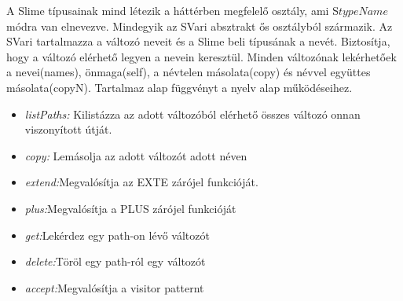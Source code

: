 {A Slime típusainak mind létezik a háttérben megfelelő osztály, ami S{$ typeName $} módra van elnevezve. 
Mindegyik az SVari absztrakt ős osztályból származik.
Az SVari tartalmazza a változó neveit és a Slime beli típusának a nevét.
Biztosítja, hogy a változó elérhető legyen a nevein keresztül.
Minden változónak lekérhetőek a nevei(names), önmaga(self), a névtelen másolata(copy) és névvel együttes másolata(copyN).
Tartalmaz alap függvényt a nyelv alap működéseihez.
\begin{itemize}
\item \emph{listPaths:} Kilistázza az adott változóból elérhető összes változó onnan viszonyított útját.
\item \emph{copy:} Lemásolja az adott változót adott néven
\item \emph{extend:}Megvalósítja az EXTE zárójel funkcióját.
\item \emph{plus:}Megvalósítja a PLUS zárójel funkcióját
\item \emph{get:}Lekérdez egy path-on lévő változót
\item \emph{delete:}Töröl egy path-ról egy változót
\item \emph{accept:}Megvalósítja a visitor patternt
\end{itemize}

}
